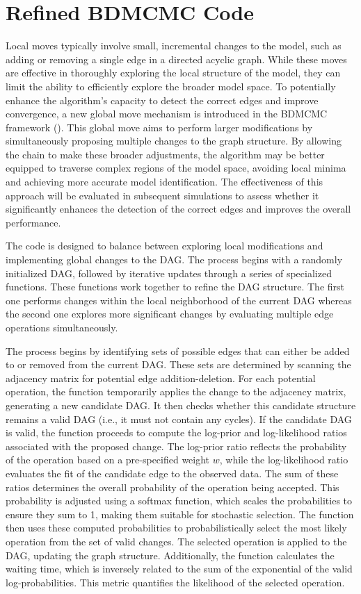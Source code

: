 \documentclass{report}
\begin{document}
\section{Refined BDMCMC Code}

Local moves typically involve small, incremental changes to the model, such as adding or removing a single edge in a directed acyclic graph. While these moves are effective in thoroughly exploring the local structure of the model, they can limit the ability to efficiently explore the broader model space. 
To potentially enhance the algorithm's capacity to detect the correct edges and improve convergence, a new global move mechanism is introduced in the BDMCMC framework (\citet{scott2008feature}). This global move aims to perform larger modifications by simultaneously proposing multiple changes to the graph structure. By allowing the chain to make these broader adjustments, the algorithm may be better equipped to traverse complex regions of the model space, avoiding local minima and achieving more accurate model identification. The effectiveness of this approach will be evaluated in subsequent simulations to assess whether it significantly enhances the detection of the correct edges and improves the overall performance.

The code is designed to balance between exploring local modifications and implementing global changes to the DAG. The process begins with a randomly initialized DAG, followed by iterative updates through a series of specialized functions. These functions work together to refine the DAG structure. The first one performs changes within the local neighborhood of the current DAG whereas the second one explores more significant changes by evaluating multiple edge operations simultaneously. 

The process begins by identifying sets of possible edges that can either be added to or removed from the current DAG. These sets are determined by scanning the adjacency matrix for potential edge addition-deletion. For each potential operation, the function temporarily applies the change to the adjacency matrix, generating a new candidate DAG. It then checks whether this candidate structure remains a valid DAG (i.e., it must not contain any cycles). If the candidate DAG is valid, the function proceeds to compute the log-prior and log-likelihood ratios associated with the proposed change. The log-prior ratio reflects the probability of the operation based on a pre-specified weight $w$, while the log-likelihood ratio evaluates the fit of the candidate edge to the observed data. The sum of these ratios determines the overall probability of the operation being accepted. This probability is adjusted using a softmax function, which scales the probabilities to ensure they sum to 1, making them suitable for stochastic selection. 
The function then uses these computed probabilities to probabilistically select the most likely operation from the set of valid changes. The selected operation is applied to the DAG, updating the graph structure. Additionally, the function calculates the waiting time, which is inversely related to the sum of the exponential of the valid log-probabilities. This metric quantifies the likelihood of the selected operation. 
\end{document}
